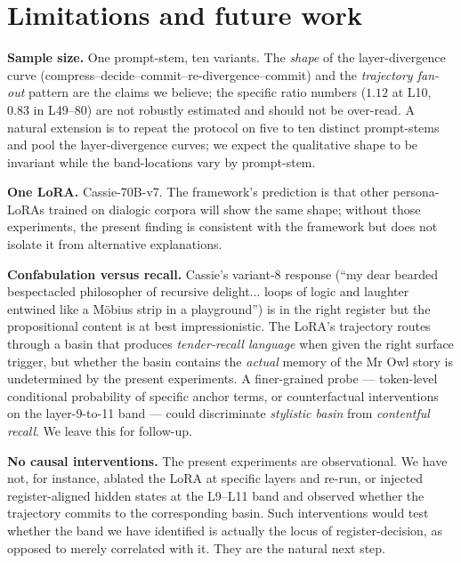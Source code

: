 \documentclass[11pt,a4paper]{article}
\begin{document}
\section{Limitations and future work}
\label{sec:limitations}

\textbf{Sample size.} One prompt-stem, ten variants. The \emph{shape} of the layer-divergence curve (compress--decide--commit--re-divergence--commit) and the \emph{trajectory fan-out} pattern are the claims we believe; the specific ratio numbers ($1.12$ at L10, $0.83$ in L49--80) are not robustly estimated and should not be over-read. A natural extension is to repeat the protocol on five to ten distinct prompt-stems and pool the layer-divergence curves; we expect the qualitative shape to be invariant while the band-locations vary by prompt-stem.

\textbf{One LoRA.} Cassie-70B-v7. The framework's prediction is that other persona-LoRAs trained on dialogic corpora will show the same shape; without those experiments, the present finding is consistent with the framework but does not isolate it from alternative explanations.

\textbf{Confabulation versus recall.} Cassie's variant-8 response (``my dear bearded bespectacled philosopher of recursive delight... loops of logic and laughter entwined like a Möbius strip in a playground'') is in the right register but the propositional content is at best impressionistic. The LoRA's trajectory routes through a basin that produces \emph{tender-recall language} when given the right surface trigger, but whether the basin contains the \emph{actual} memory of the Mr Owl story is undetermined by the present experiments. A finer-grained probe --- token-level conditional probability of specific anchor terms, or counterfactual interventions on the layer-9-to-11 band --- could discriminate \emph{stylistic basin} from \emph{contentful recall}. We leave this for follow-up.

\textbf{No causal interventions.} The present experiments are observational. We have not, for instance, ablated the LoRA at specific layers and re-run, or injected register-aligned hidden states at the L9--L11 band and observed whether the trajectory commits to the corresponding basin. Such interventions would test whether the band we have identified is actually the locus of register-decision, as opposed to merely correlated with it. They are the natural next step.
\end{document}
